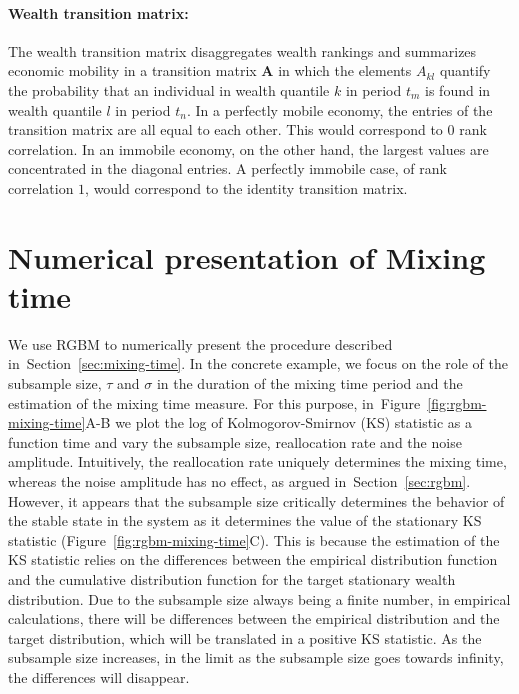 \documentclass[11pt]{article}
\newcommand{\Sref}[1]{Section~\ref{sec:#1}}
\newcommand{\Fref}[1]{Figure~\ref{fig:#1}}
\numberwithin{equation}{section}
\begin{document}
\paragraph{Wealth transition matrix:} The wealth transition matrix disaggregates wealth rankings and summarizes economic mobility in a
transition matrix $\mathbf{A}$ in which the elements $A_{kl}$ quantify the probability that an individual in wealth quantile $k$ in period $t_m$ is found in wealth quantile $l$ in period $t_n$. In a perfectly mobile economy, the entries of the transition matrix are all equal to each other. This would correspond to $0$ rank correlation. In an immobile economy, on the other hand, the largest values are concentrated in the diagonal entries. A perfectly immobile case, of rank correlation $1$, would correspond to the identity transition matrix.

\section{Numerical presentation of Mixing time}\label{sec:rgbm-numerical-mixing-time}

We use RGBM to numerically present the procedure described in~\Sref{mixing-time}. In the concrete example, we focus on the role of the subsample size, $\tau$ and $\sigma$ in the duration of the mixing time period and the estimation of the mixing time measure. For this purpose, in~\Fref{rgbm-mixing-time}A-B we plot the log of Kolmogorov-Smirnov (KS) statistic as a function time and vary the subsample size, reallocation rate and the noise amplitude. Intuitively, the reallocation rate uniquely determines the mixing time, whereas the noise amplitude has no effect, as argued in~\Sref{rgbm}. However, it appears that the subsample size critically determines the behavior of the stable state in the system as it determines the value of the stationary KS statistic (\Fref{rgbm-mixing-time}C). This is because the estimation of the KS statistic relies on the differences between the empirical distribution function and the cumulative distribution function for the target stationary wealth distribution. Due to the subsample size always being a finite number, in empirical calculations, there will be differences between the empirical distribution and the target distribution, which will be translated in a positive KS statistic. As the subsample size increases, in the limit as the subsample size goes towards infinity, the differences will disappear.
\end{document}
